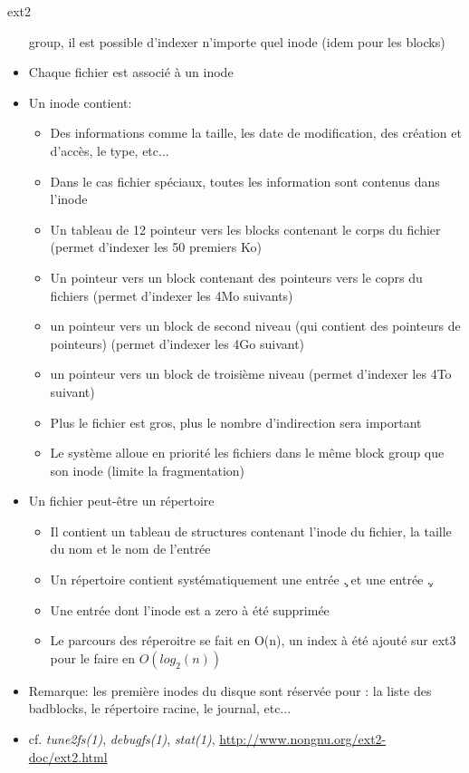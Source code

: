 \begin{frame}[fragile=singleslide]{ext2}
\begin{itemize}
    group, il  est possible d'indexer n'importe quel  inode (idem pour
    les blocks)
  \item Chaque fichier est associé à un inode
  \item Un inode contient:
    \begin{itemize}
    \item Des informations comme  la taille, les date de modification,
      des création et d'accès, le type, etc...
    \item Dans  le cas fichier  spéciaux, toutes les  information sont
      contenus dans l'inode
    \item Un tableau de 12 pointeur vers les blocks contenant le corps
      du fichier (permet d'indexer les 50 premiers Ko)
    \item Un  pointeur vers un  block contenant des pointeurs  vers le
      coprs du fichiers (permet d'indexer les 4Mo suivants)
    \item un pointeur vers un block de second niveau (qui contient des
      pointeurs de pointeurs) (permet d'indexer les 4Go suivant)
    \item  un  pointeur vers  un  block  de  troisième niveau  (permet
      d'indexer les 4To suivant)
    \item Plus le fichier est  gros, plus le nombre d'indirection sera
      important
    \item  Le système  alloue en  priorité les  fichiers dans  le même
      block group que son inode (limite la fragmentation)
    \end{itemize}
  \item Un fichier peut-être un répertoire
    \begin{itemize}
    \item Il  contient un tableau  de structures contenant  l'inode du
      fichier, la taille du nom et le nom de l'entrée
    \item Un répertoire contient  systématiquement une entrée \c{.} et
      une entrée \c{..}
    \item Une entrée dont l'inode est a zero à été supprimée
    \item Le parcours  des réperoitre se fait en O(n),  un index à été
      ajouté sur ext3 pour le faire en $O(log_2(n))$
    \end{itemize}
  \item Remarque: les  première inodes du disque sont  réservée pour :
    la liste des badblocks, le répertoire racine, le journal, etc...
  \item  cf.   \emph{tune2fs(1)},  \emph{debugfs(1)},  \emph{stat(1)},
    \url{http://www.nongnu.org/ext2-doc/ext2.html}
  \end{itemize}
\end{frame}


